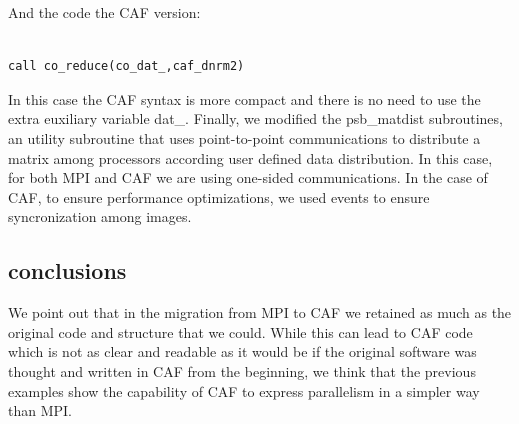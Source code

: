 \documentclass{IOS-Book-Article}
\begin{document}
And the code the CAF version: 

\begin{center}
{\small
\begin{lstlisting}

call co_reduce(co_dat_,caf_dnrm2)

\end{lstlisting}}
\end{center}
In this case the CAF syntax is more compact and there is no need to use the extra euxiliary variable dat\_.
Finally, we modified the psb\_matdist subroutines, an utility subroutine that uses point-to-point communications to distribute a matrix among processors according user defined data distribution. In this case, for both MPI and CAF we are using one-sided communications. In the case of CAF, to ensure performance optimizations, we used events to ensure syncronization among images. 

\subsection{conclusions}

We point out that in the migration from MPI to CAF we retained as much as the original code and structure that we could. While this can lead to CAF code which is not as clear and readable as it would be if the original software was thought and written in CAF from the beginning, we think that the previous examples show the capability of CAF to express parallelism in a simpler way than MPI.  
 
\end{document}
